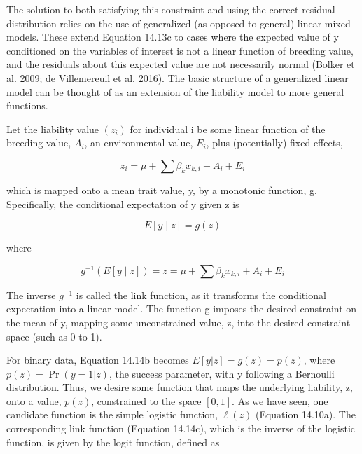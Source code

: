 \documentclass{article}
\begin{document}
The solution to both satisfying this constraint and using the correct residual distribution relies on the use of generalized (as opposed to general) linear mixed models. These extend Equation 14.13c to cases where the expected value of y conditioned on the variables of interest is not a linear function of breeding value, and the residuals about this expected value are not necessarily normal (Bolker et al. 2009; de Villemereuil et al. 2016). The basic structure of a generalized linear model can be thought of as an extension of the liability model to more general functions.

Let the liability value  $ (z_{i}) $ for individual i be some linear function of the breeding value,  $ A_{i} $, an environmental value,  $ E_{i} $, plus (potentially) fixed effects,

\begin{equation}
z_{i}=\mu+\sum\beta_{k}x_{k,i}+A_{i}+E_{i}
\tag{14.14a}
\label{eq:14_14a}
\end{equation}

which is mapped onto a mean trait value, y, by a monotonic function, g. Specifically, the conditional expectation of y given z is

\begin{equation}
E[y\mid z]=g(z)
\tag{14.14b}
\label{eq:14_14b}
\end{equation}

where

\begin{equation}
g^{-1}\left(E[y\mid z]\right)=z=\mu+\sum\beta_{k}x_{k,i}+A_{i}+E_{i}
\tag{14.14c}
\label{eq:14_14c}
\end{equation}

The inverse  $ g^{-1} $ is called the link function, as it transforms the conditional expectation into a linear model. The function g imposes the desired constraint on the mean of y, mapping some unconstrained value, z, into the desired constraint space (such as 0 to 1).

For binary data, Equation 14.14b becomes  $ E[y|z]=g(z)=p(z) $, where  $ p(z)=\Pr(y=1|z) $, the success parameter, with y following a Bernoulli distribution. Thus, we desire some function that maps the underlying liability, z, onto a value,  $ p(z) $, constrained to the space  $ [0,1] $. As we have seen, one candidate function is the simple logistic function,  $ \ell(z) $ (Equation 14.10a). The corresponding link function (Equation 14.14c), which is the inverse of the logistic function, is given by the logit function, defined as
\end{document}
